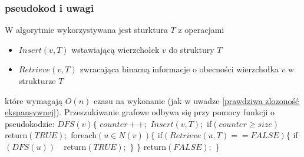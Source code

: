 \documentclass{pracamgr}
\begin{document}
    \subsubsection{pseudokod i uwagi}
     W algorytmie wykorzystywana jest sturktura $T$ z operacjami
     \begin{itemize}
      \item $Insert(v,T)$ wstawiającą wierzchołek $v$ do struktury $T$
      \item $Retrieve(v,T)$ zwracająca binarną informacje o obecności wierzchołka $v$ w strukturze $T$
     \end{itemize}
     które wymagają $O(n)$ czasu na wykonanie (jak w uwadze \ref{prawdziwa zlozoność ekspansywnej}).\newline
     Przeszukiwanie grafowe odbywa się przy pomocy funkcji o pseudokodzie:\newline\newline
     \hspace*{0pt}$DFS(v)\{$\newline
     \hspace*{16pt}	$counter++;$\newline
     \hspace*{16pt}	$Insert(v,T);$\newline
     \hspace*{16pt}	if$(counter\ge size)\quad $return$(TRUE);$\newline
     \hspace*{16pt}	foreach$(u\in N(v))\{$\newline
     \hspace*{32pt}		if$(Retrieve(u,T)==FALSE)\{$\newline
     \hspace*{48pt}			if$(DFS(u))\quad $return$(TRUE);$\newline
     \hspace*{32pt}		$\}$\newline
     \hspace*{16pt}	$\}$\newline
     \hspace*{16pt}	return$(FALSE);$\newline
     \hspace*{0pt}$\}$\newline  
\end{document}
